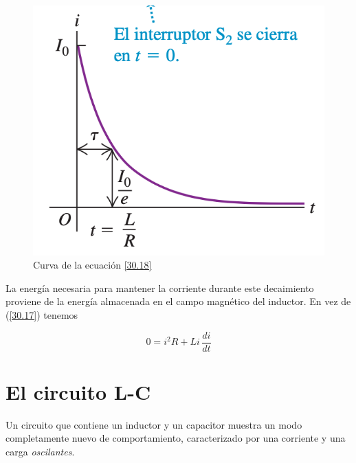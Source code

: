 \begin{figure}[h]
\centering
\includegraphics[scale=0.4]{fig/r-l-desconexion}
\caption{Curva de la ecuación \ref{30.18}}
\label{fig:r-l-desconexion}
\end{figure}

La energía necesaria para mantener la corriente durante este decaimiento proviene de la energía almacenada en el campo magnético del inductor. En vez de (\ref{30.17}) tenemos

\begin{equation}\label{30.19}
0=i^2R+Li\, \frac{di}{dt}
\end{equation}

\section{El circuito L-C}
Un circuito que contiene un inductor y un capacitor muestra un modo completamente nuevo de comportamiento, caracterizado por una corriente y una carga \textit{oscilantes}.

